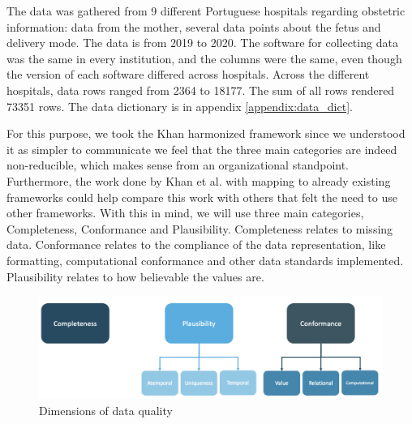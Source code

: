 The data was gathered from 9 different Portuguese hospitals regarding obstetric information: data from the mother, several data points about the fetus and delivery mode. The data is from 2019 to 2020. The software for collecting data was the same in every institution, and the columns were the same, even though the version of each software differed across hospitals. Across the different hospitals, data rows ranged from 2364 to 18177. The sum of all rows rendered 73351 rows. The data dictionary is in appendix \ref{appendix:data_dict}.

For this purpose, we took the Khan harmonized framework since we understood it as simpler to communicate we feel that the three main categories are indeed non-reducible, which makes sense from an organizational standpoint. Furthermore, the work done by Khan et al. with mapping to already existing frameworks could help compare this work with others that felt the need to use other frameworks.
With this in mind, we will use three main categories, Completeness, Conformance and Plausibility. Completeness relates to missing data. Conformance relates to the compliance of the data representation, like formatting, computational conformance and other data standards implemented. Plausibility relates to how believable the values are.

\begin{figure}[htbp]
\centering
\caption{Dimensions of data quality}\label{fig:categories} 
\includegraphics[scale=0.29]{figures/data-quality-v1.png}
\end{figure}
